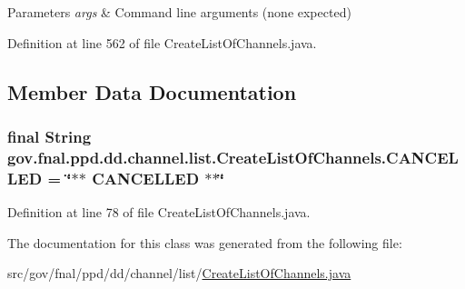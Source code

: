 \begin{DoxyParams}{Parameters}
{\em args} & Command line arguments (none expected) \\
\hline
\end{DoxyParams}


Definition at line 562 of file Create\-List\-Of\-Channels.\-java.



\subsection{Member Data Documentation}
\hypertarget{classgov_1_1fnal_1_1ppd_1_1dd_1_1channel_1_1list_1_1CreateListOfChannels_a0eefced0aa80da149689c678803811f2}{
\subsubsection[{C\-A\-N\-C\-E\-L\-L\-E\-D}]{\setlength{\rightskip}{0pt plus 5cm}final String gov.\-fnal.\-ppd.\-dd.\-channel.\-list.\-Create\-List\-Of\-Channels.\-C\-A\-N\-C\-E\-L\-L\-E\-D = \char`\"{}$\ast$$\ast$ C\-A\-N\-C\-E\-L\-L\-E\-D $\ast$$\ast$\char`\"{}\hspace{0.3cm}{\ttfamily [static]}}}\label{classgov_1_1fnal_1_1ppd_1_1dd_1_1channel_1_1list_1_1CreateListOfChannels_a0eefced0aa80da149689c678803811f2}


Definition at line 78 of file Create\-List\-Of\-Channels.\-java.



The documentation for this class was generated from the following file\-:\begin{DoxyCompactItemize}
\item 
src/gov/fnal/ppd/dd/channel/list/\hyperlink{CreateListOfChannels_8java}{Create\-List\-Of\-Channels.\-java}\end{DoxyCompactItemize}
